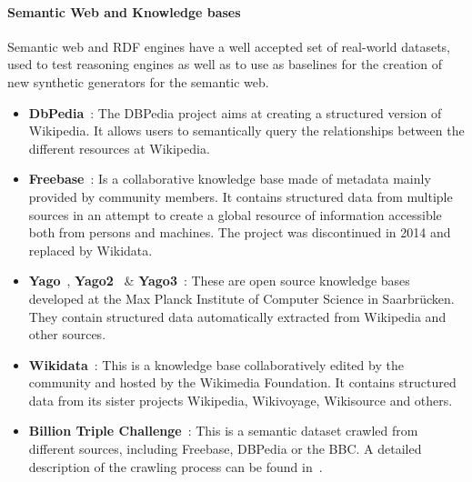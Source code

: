 \paragraph{Semantic Web and Knowledge bases}

Semantic web and RDF engines have a well accepted set of real-world datasets, used to
test reasoning engines as well as to use as baselines for the creation of new
synthetic generators for the semantic web.

\begin{itemize}
  \item \textbf{DbPedia}~\cite{Bizer:2009:DCP:1640541.1640848}: The DBPedia project aims at creating
    a structured version of Wikipedia. It allows users to semantically query the
    relationships between the different resources at Wikipedia.
  \item \textbf{Freebase}~\cite{bollacker2008freebase}: Is a collaborative knowledge base
    made of metadata mainly provided by community members. It contains
    structured data from multiple sources in an attempt to create a global
    resource of information accessible both from persons and machines. The
    project was discontinued in 2014 and replaced by Wikidata.
  \item \textbf{Yago}~\cite{suchanek2007yago}, \textbf{Yago2}~\cite{hoffart2013yago2} \&
    \textbf{Yago3}~\cite{mahdisoltani2013yago3}: These are
    open source knowledge bases developed at the Max Planck Institute of
    Computer Science in Saarbr\"ucken. They contain structured data automatically extracted
    from Wikipedia and other sources.
  \item \textbf{Wikidata}~\cite{vrandevcic2014wikidata}: This is a knowledge base
    collaboratively edited by the community and hosted by the Wikimedia
    Foundation. It contains structured data from its sister projects Wikipedia,
    Wikivoyage, Wikisource and others.
  \item \textbf{Billion Triple Challenge}~\cite{btc-2014}: This is a semantic dataset
    crawled from different sources, including Freebase, DBPedia or the BBC. A
    detailed description of the crawling process can be found in~\cite{kafer2012towards}.
\end{itemize}

